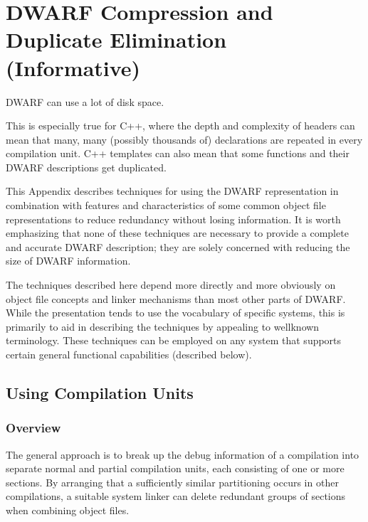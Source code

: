 \chapter[Compression (Informative)]{DWARF Compression and Duplicate Elimination (Informative)}
\label{dwarfcompressionandduplicateeliminationinformative}


DWARF 
can 
use a lot of disk space.

This is especially true for C++, where the depth and complexity
of headers can mean that many, many (possibly thousands of)
declarations are repeated in every compilation unit. C++
templates can also mean that some functions and their DWARF
descriptions get duplicated.

This Appendix describes techniques for using the DWARF
representation in combination with features and characteristics
of some common object file representations to reduce redundancy
without losing information. It is worth emphasizing that none
of these techniques are necessary to provide a complete and
accurate DWARF description; they are solely concerned with
reducing the size of DWARF information.

The techniques described here depend more directly and more
obviously on object file concepts and linker mechanisms than
most other parts of DWARF. While the presentation tends to
use the vocabulary of specific systems, this is primarily to
aid in describing the techniques by appealing to well\dash known
terminology. These techniques can be employed on any system
that supports certain general functional capabilities
(described below).


\section{Using Compilation Units}
\label{app:usingcompilationunits}

\subsection{Overview}
The general approach is to break up the debug information of
a compilation into separate normal and partial compilation
units, each consisting of one or more sections. By arranging
that a sufficiently similar partitioning occurs in other
compilations, a suitable system linker can delete redundant
groups of sections when combining object files.

